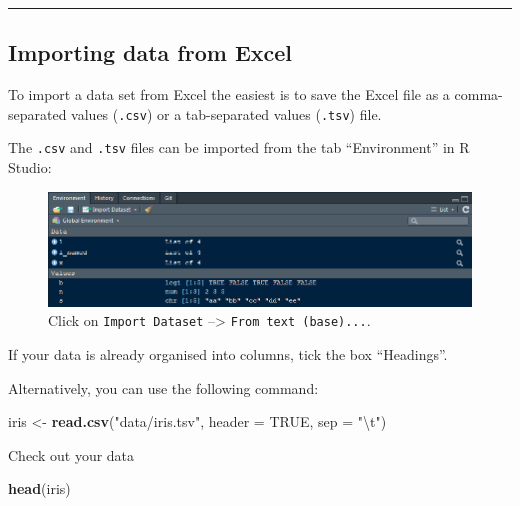 \documentclass[
]{article}
\newenvironment{Shaded}{\begin{snugshade}}{\end{snugshade}}
\newcommand{\CharTok}[1]{\textcolor[rgb]{0.31,0.60,0.02}{#1}}
\newcommand{\DataTypeTok}[1]{\textcolor[rgb]{0.13,0.29,0.53}{#1}}
\newcommand{\KeywordTok}[1]{\textcolor[rgb]{0.13,0.29,0.53}{\textbf{#1}}}
\newcommand{\NormalTok}[1]{#1}
\newcommand{\OtherTok}[1]{\textcolor[rgb]{0.56,0.35,0.01}{#1}}
\newcommand{\StringTok}[1]{\textcolor[rgb]{0.31,0.60,0.02}{#1}}
\begin{document}
\begin{center}\rule{0.5\linewidth}{\linethickness}\end{center}

\hypertarget{importing-data-from-excel}{%
\subsection{Importing data from Excel}\label{importing-data-from-excel}}

To import a data set from Excel the easiest is to save the Excel file as
a comma-separated values (\texttt{.csv}) or a tab-separated values
(\texttt{.tsv}) file.

The \texttt{.csv} and \texttt{.tsv} files can be imported from the tab
``Environment'' in R Studio:

\begin{figure}
\centering
\includegraphics{imgs/Import.PNG}
\caption{Click on \texttt{Import\ Dataset} --\textgreater{}
\texttt{From\ text\ (base)...}.}
\end{figure}

If your data is already organised into columns, tick the box
``Headings''.

Alternatively, you can use the following command:

\begin{Shaded}
\begin{Highlighting}[]
\NormalTok{iris <-}\StringTok{ }\KeywordTok{read.csv}\NormalTok{(}\StringTok{"data/iris.tsv"}\NormalTok{, }\DataTypeTok{header =} \OtherTok{TRUE}\NormalTok{, }\DataTypeTok{sep =} \StringTok{"}\CharTok{\textbackslash{}t}\StringTok{"}\NormalTok{)}
\end{Highlighting}
\end{Shaded}

Check out your data

\begin{Shaded}
\begin{Highlighting}[]
\KeywordTok{head}\NormalTok{(iris)}
\end{Highlighting}
\end{Shaded}
\end{document}
